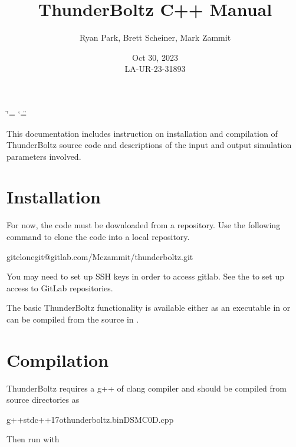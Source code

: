\documentclass[letterpaper,10pt,english,openany,oneside]{sphinxmanual}
\title{ThunderBoltz C++ Manual}
\date{Oct 30, 2023\\LA-UR-23-31893}
\author{Ryan Park, Brett Scheiner, Mark Zammit}
\affil{Los Alamos National Laboratory, Los Alamos, NM, 87545}
\begin{document}
\ifdefined\shorthandoff
  \ifnum\catcode`\=\string=\active\shorthandoff{=}\fi
  \ifnum\catcode`\"=\active{}\fi
\fi

\pagestyle{empty}
\sphinxmaketitle
\pagestyle{plain}
\sphinxtableofcontents
\pagestyle{normal}
\label{\detokenize{short_index::doc}}


\sphinxAtStartPar
This documentation includes instruction on installation
and compilation of ThunderBoltz source code and descriptions
of the input and output simulation parameters involved.


\chapter{Installation}
\label{\detokenize{short_index:installation}}
\sphinxAtStartPar
For now, the code must be downloaded from a repository.
Use the following command to clone the code into a local repository.

\begin{sphinxVerbatim}[commandchars=\\\{\}]
gitclonegit@gitlab.com/Mczammit/thunderboltz.git
\end{sphinxVerbatim}

\sphinxAtStartPar
You may need to set up SSH keys in order to access gitlab. See the
 to
set up access to GitLab repositories.

\sphinxAtStartPar
The basic ThunderBoltz functionality is available either
as an executable in  or can be compiled from the
source in .

\chapter{Compilation}
\label{\detokenize{short_index:compilation}}
\sphinxAtStartPar
ThunderBoltz requires a g++ of clang compiler and should be compiled
from source directories as

\begin{sphinxVerbatim}[commandchars=\\\{\}]
g++\PYGZhy{}stdc++17\PYGZhy{}othunderboltz.binDSMC0D.cpp
\end{sphinxVerbatim}

\sphinxAtStartPar
Then run with
\end{document}
